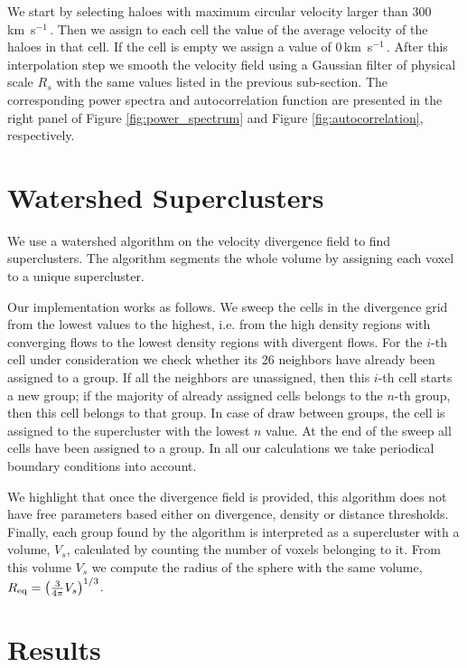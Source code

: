 \documentclass[usenatbib]{mnras}
\newcommand{\kms}{\,{\rm km}\ s$^{-1}$\,}
\begin{document}
We start by selecting haloes with maximum circular velocity larger
than $300$ \kms.
Then we assign to each cell the value of the average velocity of the haloes in that cell. 
If the cell is empty we assign a value of $0$\kms.
After this interpolation step we smooth the velocity field using a Gaussian filter of physical scale $R_s$ with the same values listed in the previous sub-section.
The corresponding power spectra and autocorrelation function are presented in the right panel of Figure \ref{fig:power_spectrum}
 and Figure \ref{fig:autocorrelation}, respectively.



\section{Watershed Superclusters}

We use a watershed algorithm \citep{BeucherWatershed1979} on the velocity divergence field to find
superclusters.
The algorithm segments the whole volume by assigning each voxel to a unique supercluster. 

Our implementation works as follows. 
We sweep the cells in the divergence grid from the lowest values to the highest, i.e. from
the high density regions with converging flows to the lowest density regions with divergent
flows.
For the $i$-th cell under consideration we check whether its 26 neighbors have already been assigned to a group. 
If all the neighbors are unassigned, then this $i$-th cell starts a
new group; if the majority of already assigned cells belongs to the
$n$-th group, then this cell belongs to that group.
In case of draw between groups, the cell is assigned to the supercluster with the lowest $n$ value.
At the end of the sweep all cells have been assigned to a group. 
In all our calculations we take periodical boundary conditions into
account.  

We highlight that once the divergence field is provided, this algorithm
does not have free parameters based either on divergence, density or distance thresholds. 
Finally, each group found by the algorithm is interpreted as a supercluster 
with a volume, $V_s$, calculated by counting the number of voxels belonging to it.
From this volume $V_s$ we compute the radius of the sphere with the same volume, 
   $ R_{\rm eq} = \left(\frac{3}{4\pi}V_{s}\right)^{1/3}$.



\section{Results}
\end{document}
